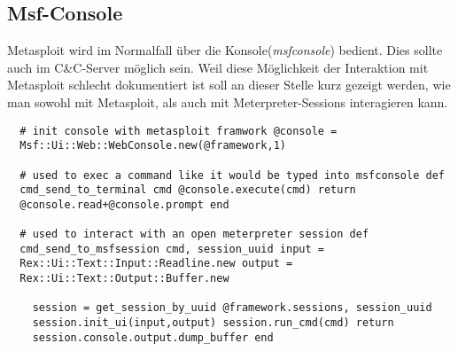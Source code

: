 %
\subsection{Msf-Console}

Metasploit wird im Normalfall über die Konsole(\textit{msfconsole})
bedient.  Dies sollte auch im C\&C-Server möglich sein. Weil diese
Möglichkeit der Interaktion mit Metasploit schlecht dokumentiert ist
soll an dieser Stelle kurz gezeigt werden, wie man sowohl mit
Metasploit, als auch mit Meterpreter-Sessions interagieren
kann.

\begin{lstlisting}
  # init console with metasploit framwork @console =
  Msf::Ui::Web::WebConsole.new(@framework,1)

  # used to exec a command like it would be typed into msfconsole def
  cmd_send_to_terminal cmd @console.execute(cmd) return
  @console.read+@console.prompt end

  # used to interact with an open meterpreter session def
  cmd_send_to_msfsession cmd, session_uuid input =
  Rex::Ui::Text::Input::Readline.new output =
  Rex::Ui::Text::Output::Buffer.new

    session = get_session_by_uuid @framework.sessions, session_uuid
    session.init_ui(input,output) session.run_cmd(cmd) return
    session.console.output.dump_buffer end
\end{lstlisting}

